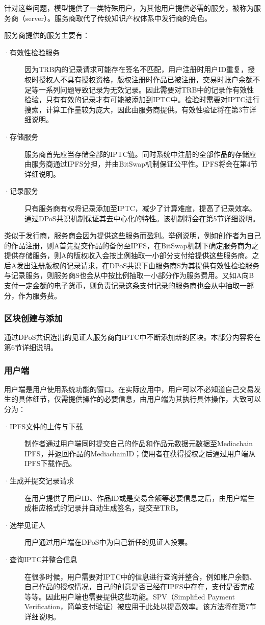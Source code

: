 \documentclass[withoutpreface,bwprint]{cumcmthesis} %
\begin{document}
针对这些问题，模型提供了一类特殊用户，为其他用户提供必需的服务，被称为服务商（server）。服务商取代了传统知识产权体系中发行商的角色。

服务商提供的服务主要有：
\begin{description}
	\item[·有效性检验服务] 因为TRB内的记录请求可能存在签名不匹配，用户注册时用户ID重复，授权时授权人不具有授权资格，版权注册时作品已被注册，交易时账户余额不足等一系列问题导致记录为无效记录。因此需要对TRB中的记录作有效性检验，只有有效的记录才有可能被添加到IPTC中。检验时需要对IPTC进行搜索，计算工作量较为庞大，因此由服务商提供。有效性验证将在第3节详细说明。
	\item[·存储服务] 服务商首先应当存储全部的IPTC链。同时系统中注册的全部作品的存储应由服务商通过IPFS分担，并由BitSwap机制保证公平性。IPFS将会在第4节详细说明。
	\item[·记录服务] 只有服务商有权将记录添加至IPTC，减少了计算难度，提高了记录效率。通过DPoS共识机制保证其去中心化的特性。该机制将会在第5节详细说明。
\end{description}

类似于发行商，服务商会因为提供这些服务而盈利。举例说明，例如创作者为自己的作品注册，则A首先提交作品的备份至IPFS，在BitSwap机制下确定服务商为之提供存储服务，则A的版权收入会按比例抽取一小部分支付给提供这些服务商。之后A发出注册版权的记录请求，在DPoS共识下由服务商S为其提供有效性检验服务与记录服务，则服务商S也会从中按比例抽取一小部分作为服务费用。又如A向B支付一定金额的电子货币，则负责记录这条支付记录的服务商也会从中抽取一部分，作为服务费。

\subsubsection{区块创建与添加}
通过DPoS共识选出的见证人服务商向IPTC中不断添加新的区块。本部分内容将在第6节详细说明。

\subsubsection{用户端}
用户端是用户使用系统功能的窗口。在实际应用中，用户可以不必知道自己交易发生的具体细节，仅需提供操作的必要信息，由用户端为其执行具体操作，大致可以分为：
\begin{description}
	\item[·IPFS文件的上传与下载] 制作者通过用户端同时提交自己的作品和作品元数据元数据至Mediachain IPFS，并返回作品的MediachainID；使用者在获得授权之后通过用户端从IPFS下载作品。
	\item[·生成并提交记录请求] 在用户提供了用户ID、作品ID或是交易金额等必要信息之后，由用户端生成相应格式的记录并自动生成签名，提交至TRB。
	\item[·选举见证人] 用户通过用户端在DPoS中为自己新任的见证人投票。
	\item[·查询IPTC并整合信息] 在很多时候，用户需要对IPTC中的信息进行查询并整合，例如账户余额、自己作品的授权情况，自己的创意是否已经在IPFS中存在，支付是否完成等等。因此用户端也需要提供这些功能。SPV（Simplified Payment Verification，简单支付验证）被应用于此处以提高效率。该方法将在第7节详细说明。
\end{description}
\end{document}
